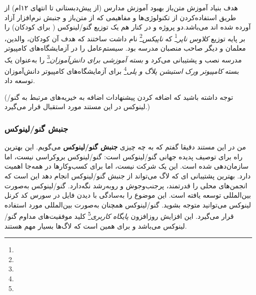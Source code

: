 \begin{itemize}

هدف بنیاد آموزش متن‌باز بهبود آموزش مدارس (از پیش‌دبستانی تا انتهای ۱۲ام)
از طریق استفاده‌کردن از تکنولوژی‌ها و مفاهیمی که از متن‌باز و جنبش نرم‌افزار آزاد
آورده شده اند می‌باشد.دو پروژه  و  در کنار هم یک توزیع گنو/لینوکس
(
برای کودکان) را بر پایه توزیع
\emph{کلاوس ناپر}\footnote{}
که
\emph{ناپیکس}\footnote{}
نام داشت ساختند که هدف آن کودکان، والدین، معلمان و دیگر صاحب منصبان مدرسه بود.
سیستم‌عامل را در آزمایشگاه‌های کامپیوتر مدرسه نصب و پشتیبانی می‌کرد و
\emph{بسته آموزشی برای دانش‌آموزان}\footnote{}
را به‌عنوان یک بسته
\emph{کامپیوتر ورک استیشن پلاگ و پلی}\footnote{}
برای آزمایشگاه‌های کامپیوتر دانش‌آموزان توسعه داد.

\end{itemize}

(توجه داشته باشید که اضافه کردن پیشنهادات اضافه به خیریه‌های
مرتبط به گنو/لینوکس در این مستند مورد استقبال قرار می‌گیرد.)

\subsubsection{جنبش گنو/لینوکس}

من در این مستند دقیقا گفتم که به چه چیزی 
{\bfseries جنبش گنو/لینوکس}
می‌گویم. این بهترین راه برای توصیف پدیده جهانی گنو/لینوکس است:
گنو/لینوکس بروکراسی نیست، اما سازمان‌دهی شده است. این یک شرکت نیست،
اما برای کسب‌وکارها در همه‌جا اهمیت دارد. بهترین پشتیبانی ای که لاگ
می‌تواند از جنبش گنو/لینوکس انجام دهد این است که انجمن‌های محلی را قدرتمند،
پرجنب‌وجوش و روبه‌رشد نگه‌دارد.
گنو/لینوکس به‌صورت بین‌المللی توسعه یافته است. این موضوع را به‌سادگی
با دیدن فایل  در سورس کد کرنل لینوکس می‌توانید متوجه بشوید.
گنو/لینوکس همچنان به‌صورت بین‌المللی مورد استفاده قرار می‌گیرد.
این افزایش روزافزون
\emph{پایگاه کاربری}\footnote{}
کلید موفقیت‌های مداوم گنو/لینوکس می‌باشد و برای همین است که لاگ‌ها بسیار مهم هستند.

